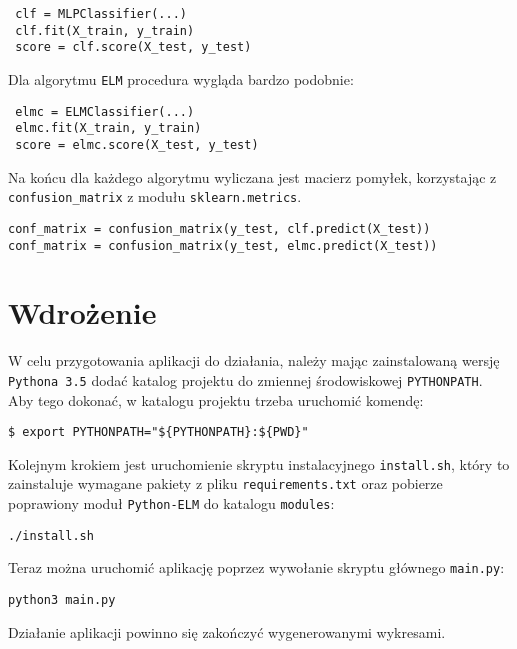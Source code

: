 \begin{verbatim}
 clf = MLPClassifier(...)
 clf.fit(X_train, y_train)
 score = clf.score(X_test, y_test)
\end{verbatim}

Dla algorytmu \texttt{ELM} procedura wygląda bardzo podobnie:

\begin{verbatim}
 elmc = ELMClassifier(...)
 elmc.fit(X_train, y_train)
 score = elmc.score(X_test, y_test)
\end{verbatim}

\newpage

Na końcu dla każdego algorytmu wyliczana jest macierz pomyłek, korzystając z \texttt{confusion\_matrix} z modułu \texttt{sklearn.metrics}.

\begin{verbatim}
conf_matrix = confusion_matrix(y_test, clf.predict(X_test))
conf_matrix = confusion_matrix(y_test, elmc.predict(X_test))
\end{verbatim}

\section{Wdrożenie}

W celu przygotowania aplikacji do działania, należy mając zainstalowaną wersję \texttt{Pythona 3.5} dodać katalog projektu do zmiennej środowiskowej \texttt{PYTHONPATH}. Aby tego dokonać, w katalogu projektu trzeba uruchomić komendę:

\begin{verbatim}
$ export PYTHONPATH="${PYTHONPATH}:${PWD}"
\end{verbatim}

Kolejnym krokiem jest uruchomienie skryptu instalacyjnego \texttt{install.sh}, który to zainstaluje wymagane pakiety z pliku \texttt{requirements.txt} oraz pobierze poprawiony moduł \texttt{Python-ELM} do katalogu \texttt{modules}:

\begin{verbatim}
./install.sh
\end{verbatim}

Teraz można uruchomić aplikację poprzez wywołanie skryptu głównego \texttt{main.py}:

\begin{verbatim}
python3 main.py
\end{verbatim}

Działanie aplikacji powinno się zakończyć wygenerowanymi wykresami.